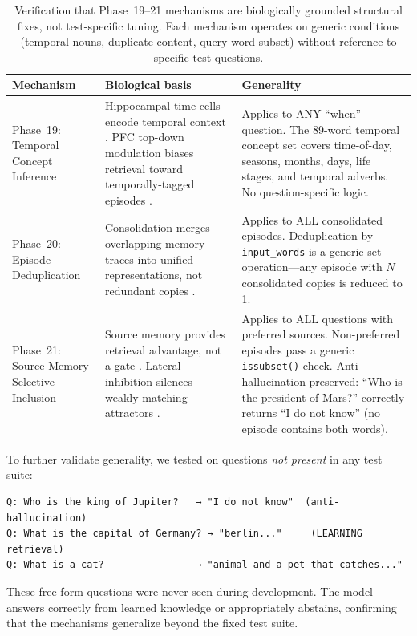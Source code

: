 \documentclass[11pt]{article}
\begin{document}
\begin{table}[h]
\centering
\small
\begin{tabular}{p{2.8cm}p{4.5cm}p{4.5cm}}
\toprule
\textbf{Mechanism} & \textbf{Biological basis} & \textbf{Generality} \\
\midrule
Phase~19: Temporal Concept Inference &
  Hippocampal time cells encode temporal context \citep{eichenbaum2014time}.
  PFC top-down modulation biases retrieval toward temporally-tagged episodes
  \citep{miller2001integrative}. &
  Applies to ANY ``when'' question. The 89-word temporal concept set covers
  time-of-day, seasons, months, days, life stages, and temporal adverbs.
  No question-specific logic. \\
\midrule
Phase~20: Episode Deduplication &
  Consolidation merges overlapping memory traces into unified representations,
  not redundant copies \citep{born2012system}. &
  Applies to ALL consolidated episodes. Deduplication by \texttt{input\_words}
  is a generic set operation---any episode with $N$ consolidated copies is
  reduced to 1. \\
\midrule
Phase~21: Source Memory Selective Inclusion &
  Source memory provides retrieval advantage, not a gate
  \citep{johnson1993source}. Lateral inhibition silences weakly-matching
  attractors \citep{desimone1995neural}. &
  Applies to ALL questions with preferred sources. Non-preferred episodes
  pass a generic \texttt{issubset()} check. Anti-hallucination preserved:
  ``Who is the president of Mars?'' correctly returns ``I do not know''
  (no episode contains both words). \\
\bottomrule
\end{tabular}
\caption{Verification that Phase~19--21 mechanisms are biologically grounded
structural fixes, not test-specific tuning. Each mechanism operates on generic
conditions (temporal nouns, duplicate content, query word subset) without
reference to specific test questions.}
\end{table}

To further validate generality, we tested on questions \emph{not present} in any
test suite:

{\small
\begin{verbatim}
Q: Who is the king of Jupiter?   → "I do not know"  (anti-hallucination)
Q: What is the capital of Germany? → "berlin..."     (LEARNING retrieval)
Q: What is a cat?                → "animal and a pet that catches..."
\end{verbatim}
}

\noindent These free-form questions were never seen during development. The model
answers correctly from learned knowledge or appropriately abstains, confirming that
the mechanisms generalize beyond the fixed test suite.
\end{document}
